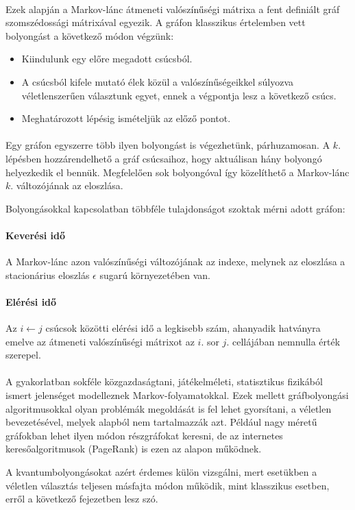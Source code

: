 \paragraph{}

Ezek alapján a Markov-lánc átmeneti valószínűségi mátrixa a fent definiált gráf
szomszédossági mátrixával egyezik. A gráfon klasszikus értelemben vett
bolyongást a következő módon végzünk:

\begin{itemize}
  \item Kiindulunk egy előre megadott csúcsból.
  \item A csúcsból kifele mutató élek közül a valószínűségeikkel súlyozva
        véletlenszerűen választunk egyet, ennek a végpontja lesz a következő csúcs.
  \item Meghatározott lépésig ismételjük az előző pontot.
\end{itemize}

\paragraph{}

Egy gráfon egyszerre több ilyen bolyongást is végezhetünk, párhuzamosan. A $k.$
lépésben hozzárendelhető a gráf csúcsaihoz, hogy aktuálisan hány bolyongó
helyezkedik el bennük. Megfelelően sok bolyongóval így közelíthető a
Markov-lánc $k.$ változójának az eloszlása.

Bolyongásokkal kapcsolatban többféle tulajdonságot szoktak mérni adott gráfon:

\paragraph{Keverési idő} A Markov-lánc azon valószínűségi változójának az
indexe, melynek az eloszlása a stacionárius eloszlás $\epsilon$ sugarú
környezetében van.

\paragraph{Elérési idő} Az $i \leftarrow j$ csúcsok közötti elérési idő a
legkisebb szám, ahanyadik hatványra emelve az átmeneti valószínűségi mátrixot
az $i.$ sor $j.$ cellájában nemnulla érték szerepel.

\paragraph{}

A gyakorlatban sokféle közgazdaságtani, játékelméleti, statisztikus fizikából
ismert jelenséget modelleznek Markov-folyamatokkal. Ezek mellett gráfbolyongási
algoritmusokkal olyan problémák megoldását is fel lehet gyorsítani, a véletlen
bevezetésével, melyek alapból nem tartalmazzák azt. Például nagy méretű
gráfokban lehet ilyen módon részgráfokat keresni, de az internetes
keresőalgoritmusok (PageRank) is ezen az alapon működnek.

A kvantumbolyongásokat azért érdemes külön vizsgálni, mert esetükben a véletlen
választás teljesen másfajta módon működik, mint klasszikus esetben, erről a
következő fejezetben lesz szó.
